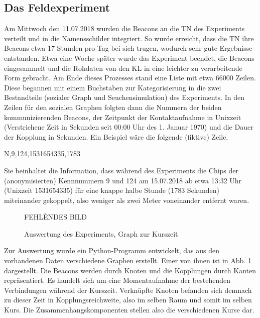 \subsection {Das Feldexperiment}
Am Mittwoch den 11.07.2018 wurden die Beacons an die TN des Experiments verteilt und in die Namensschilder integriert. So wurde erreicht, dass die TN ihre Beacons etwa 17 Stunden pro Tag bei sich trugen, wodurch sehr gute Ergebnisse entstanden. Etwa eine Woche später wurde das Experiment beendet, die Beacons eingesammelt und die Rohdaten von den KL in eine leichter zu verarbeitende Form gebracht. Am Ende dieses Prozesses stand eine Liste mit etwa 66000 Zeilen. Diese begannen mit einem Buchstaben zur Kategorisierung in die zwei Bestandteile (sozialer Graph und Seuchensimulation) des Experiments. In den Zeilen für den sozialen Graphen folgten dann die Nummern der beiden kommunizierenden Beacons, der Zeitpunkt der Kontaktaufnahme in Unixzeit (Verstrichene Zeit in Sekunden seit 00:00 Uhr des 1. Januar 1970) und die Dauer der Kopplung in Sekunden. Ein Beispiel wäre die folgende (fiktive) Zeile.
\begin{center}
N,9,124,1531654335,1783
\end{center}
Sie beinhaltet die Information, dass während des Experiments die Chips der (anonymisierten) Kennnummern 9 und 124 am 15.07.2018 ab etwa 13:32 Uhr (Unixzeit 1531654335) für eine knappe halbe Stunde (1783 Sekunden)  miteinander gekoppelt, also weniger als zwei Meter voneinander entfernt waren.
\begin{figure}
FEHLÈNDES BILD
\caption{Auswertung des Experiments, Graph zur Kurszeit}
\label{Auswertung}
\end{figure}

Zur Auswertung  wurde ein Python-Programm entwickelt, das aus den vorhandenen Daten verschiedene Graphen erstellt. Einer von ihnen ist  in Abb. \ref{Auswertung} dargestellt. Die Beacons werden durch Knoten und die Kopplungen durch Kanten repräsentiert. Es handelt sich um eine Momentaufnahme der bestehenden Verbindungen während der Kurszeit. Verknüpfte Knoten befanden sich demnach zu dieser Zeit in Kopplungsreichweite, also im selben Raum und somit im selben Kurs. Die Zusammenhangskomponenten stellen also die verschiedenen Kurse dar.
